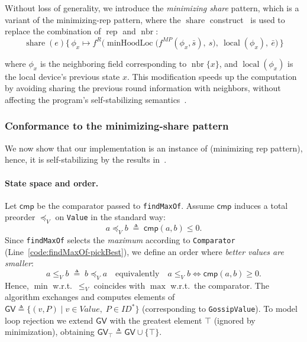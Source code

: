 \documentclass[runningheads]{llncs}
\begin{document}
Without loss of generality,
we introduce the \emph{minimizing share} pattern, which is a variant of the minimizing-rep pattern,
where the $\operatorname{share}$ construct~\cite{LMCS2020-share} is used to replace the combination of $\operatorname{rep}$ and $\operatorname{nbr}$:
%
\begin{equation}
    \label{eq:minimizing-share}
    \operatorname{share}(e)\{\,\phi_x \mapsto
    f^{R}\big(
    \operatorname{minHoodLoc}\big(
    f^{MP}(\phi_x, \bar{s}),\ s
    \big),\ \operatorname{local}(\phi_x),\ \bar{e}
    \big)
    \,\}
\end{equation}

where $\phi_x$ is the neighboring field corresponding to $\operatorname{nbr}\{x\}$, and
$\operatorname{local}(\phi_x)$ is the local device's previous state $x$.
%
This modification speeds up the computation by avoiding sharing the previous round information with neighbors,
without affecting the program's self-stabilizing semantics~\cite{LMCS2020-share}.

\subsubsection{Conformance to the minimizing-share pattern}

We now show that our implementation is an instance of 
(minimizing rep pattern),
hence,
it is self-stabilizing by the results in~\cite[\S5.2.2]{DBLP:journals/tomacs/ViroliABDP18}.

\paragraph{State space and order.}

Let $\mathsf{cmp}$ be the comparator passed to \lstinline|findMaxOf|.
Assume $\mathsf{cmp}$ induces a total preorder $\preceq_V$ on \texttt{Value} in the standard way:
\[
    a \preceq_V b \;\triangleq\; \mathsf{cmp}(a,b) \le 0.
\]
Since \lstinline|findMaxOf| selects the \emph{maximum} according to \lstinline|Comparator| (Line~\ref{code:findMaxOf-pickBest}),
we define an order where \emph{better values are smaller}:
\[
    a \le_V b \;\triangleq\; b \preceq_V a
    \quad\text{equivalently}\quad
    a \le_V b \iff \mathsf{cmp}(a,b) \ge 0.
\]
Hence, $\min$ w.r.t.\ $\le_V$ coincides with $\max$ w.r.t.\ the comparator.
%
The algorithm exchanges and computes elements of $\mathsf{GV} \triangleq \{(v,P) \mid v\in Value,\; P\in ID^{*}\}$
(corresponding to \lstinline|GossipValue|).
%
To model loop rejection we extend $\mathsf{GV}$ with the greatest element $\top$
(ignored by minimization), obtaining $\mathsf{GV}_\top \triangleq \mathsf{GV}\cup\{\top\}$.
\end{document}
